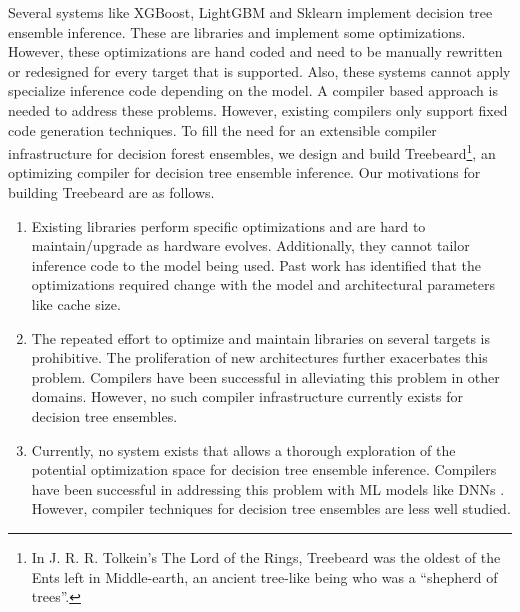 Several systems like XGBoost\cite{XGBoost}, LightGBM\cite{LightGBM} and Sklearn\cite{Sklearn} implement
decision tree ensemble inference. These are libraries and implement some optimizations. However, these optimizations are hand
coded and need to be manually rewritten or redesigned for every target that is supported. Also, these 
systems cannot apply specialize inference code depending on the model. A compiler based approach is 
needed to address these problems. However, existing compilers only support fixed code generation techniques\cite{Treelite}.
To fill the need for an extensible compiler infrastructure for decision forest ensembles, we design and 
build Treebeard\footnote{In J. R. R. Tolkein's The Lord of the Rings, Treebeard was the oldest of the Ents left in Middle-earth, an 
ancient tree-like being who was a ``shepherd of trees''.}, an optimizing compiler for decision tree ensemble inference.
Our motivations for building Treebeard are as follows. 
\begin{enumerate}
  \item Existing libraries \cite{XGBoost, Treelite, LightGBM, VPred} perform specific optimizations and are hard to maintain/upgrade as hardware evolves. 
  Additionally, they cannot tailor inference code to the model being used. Past work has identified that the optimizations required change with the model
  and architectural parameters like cache size\cite{CacheConscious1, CacheConscious2, VPred}. 
  \item The repeated effort to optimize and maintain libraries on several targets is prohibitive. The proliferation of new architectures
  further exacerbates this problem. Compilers have been successful in alleviating this problem in other domains\cite{Halide, TVM}.
  However, no such compiler infrastructure currently exists for decision tree ensembles.
  \item Currently, no system exists that allows a thorough exploration of the potential optimization space for decision tree ensemble inference. 
  Compilers have been successful in addressing this problem with ML models like DNNs \cite{TVM, Tiramisu, XLA}. However, compiler techniques for
  decision tree ensembles are less well studied.
\end{enumerate}

